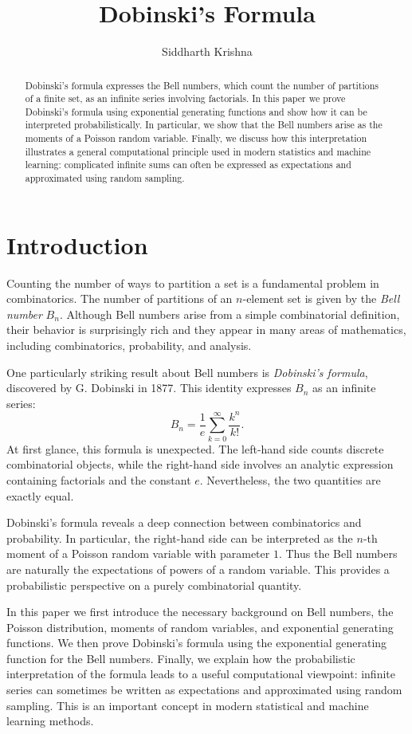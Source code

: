 \documentclass[12pt]{amsart}
\title{Dobinski's Formula}
\author{Siddharth Krishna}
\theoremstyle{plain}
\theoremstyle{definition}
\theoremstyle{remark}
\begin{document}
\begin{abstract}
Dobinski's formula expresses the Bell numbers, which count the number of partitions of a finite set, as an infinite series involving factorials. In this paper we prove Dobinski's formula using exponential generating functions and show how it can be interpreted probabilistically. In particular, we show that the Bell numbers arise as the moments of a Poisson random variable. Finally, we discuss how this interpretation illustrates a general computational principle used in modern statistics and machine learning: complicated infinite sums can often be expressed as expectations and approximated using random sampling.
\end{abstract}

\maketitle

\section{Introduction}
Counting the number of ways to partition a set is a fundamental problem in combinatorics. The number of partitions of an $n$-element set is given by the \emph{Bell number} $B_n$. Although Bell numbers arise from a simple combinatorial definition, their behavior is surprisingly rich and they appear in many areas of mathematics, including combinatorics, probability, and analysis.

One particularly striking result about Bell numbers is \emph{Dobinski's formula}, discovered by G. Dobinski in 1877. This identity expresses $B_n$ as an infinite series:
\[
B_n = \frac{1}{e}\sum_{k=0}^{\infty}\frac{k^n}{k!}.
\]
At first glance, this formula is unexpected. The left-hand side counts discrete combinatorial objects, while the right-hand side involves an analytic expression containing factorials and the constant $e$. Nevertheless, the two quantities are exactly equal.

Dobinski's formula reveals a deep connection between combinatorics and probability. In particular, the right-hand side can be interpreted as the $n$-th moment of a Poisson random variable with parameter $1$. Thus the Bell numbers are naturally the expectations of powers of a random variable. This provides a probabilistic perspective on a purely combinatorial quantity.

In this paper we first introduce the necessary background on Bell numbers, the Poisson distribution, moments of random variables, and exponential generating functions. We then prove Dobinski's formula using the exponential generating function for the Bell numbers. Finally, we explain how the probabilistic interpretation of the formula leads to a useful computational viewpoint: infinite series can sometimes be written as expectations and approximated using random sampling. This is an important concept in modern statistical and machine learning methods.
\end{document}
